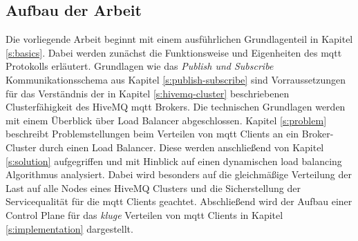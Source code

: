 \subsection{Aufbau der Arbeit}
Die vorliegende Arbeit beginnt mit einem ausführlichen Grundlagenteil in Kapitel \ref{s:basics}. Dabei werden zunächst die Funktionsweise und Eigenheiten des \ac{mqtt} Protokolls erläutert.
Grundlagen wie das \textit{Publish und Subscribe} Kommunikationsschema aus Kapitel \ref{s:publish-subscribe} sind Vorraussetzungen für das Verständnis der in Kapitel \ref{s:hivemq-cluster} beschriebenen Clusterfähigkeit des HiveMQ \acs{mqtt} Brokers.
Die technischen Grundlagen werden mit einem Überblick über Load Balancer abgeschlossen.
Kapitel \ref{s:problem} beschreibt Problemstellungen beim Verteilen von \ac{mqtt} Clients an ein Broker-Cluster durch einen Load Balancer.
Diese werden anschlie{\ss}end von Kapitel \ref{s:solution} aufgegriffen und mit Hinblick auf einen dynamischen load balancing Algorithmus analysiert. Dabei wird besonders auf die gleichmä{\ss}ige Verteilung der Last auf alle Nodes eines HiveMQ Clusters und die Sicherstellung der Servicequalität für die \ac{mqtt} Clients geachtet.
Abschlie{\ss}end wird der Aufbau einer Control Plane für das \textit{kluge} Verteilen von \ac{mqtt} Clients in Kapitel \ref{s:implementation} dargestellt.

\newpage

